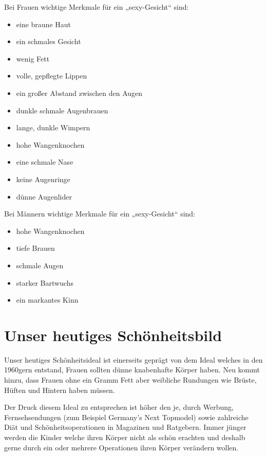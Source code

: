 \newpage
Bei Frauen wichtige Merkmale für ein „sexy-Gesicht“ sind:
\begin{multicols}{2}
\begin{itemize}
	\item eine braune Haut
	\item ein schmales Gesicht
	\item wenig Fett
	\item volle, gepflegte Lippen
	\item ein großer Abstand zwischen den Augen
	\item dunkle schmale Augenbrauen
	\item lange, dunkle Wimpern
	\item hohe Wangenknochen
	\item eine schmale Nase
	\item keine Augenringe
	\item dünne Augenlider
\end{itemize}
\end{multicols}

Bei Männern wichtige Merkmale für ein „sexy-Gesicht“ sind:
\begin{multicols}{2}
\begin{itemize}
	\item hohe Wangenknochen
	\item tiefe Brauen
	\item schmale Augen
	\item starker Bartwuchs
	\item ein markantes Kinn
\end{itemize}
\end{multicols}


\section{Unser heutiges Schönheitsbild}
Unser heutiges Schönheitsideal ist einerseits geprägt von dem Ideal welches in den 1960gern entstand,
Frauen sollten dünne knabenhafte Körper haben. Neu kommt hinzu, dass Frauen ohne ein Gramm Fett aber
weibliche Rundungen wie Brüste, Hüften und Hintern haben müssen.

Der Druck diesem Ideal zu entsprechen ist höher den je, durch Werbung, Fernsehsendungen (zum Beispiel
Germany’s Next Topmodel) sowie zahlreiche Diät und Schönheitsoperationen in Magazinen und
Ratgebern. Immer jünger werden die Kinder welche ihren Körper nicht als schön erachten und deshalb
gerne durch ein oder mehrere Operationen ihren Körper verändern wollen.

